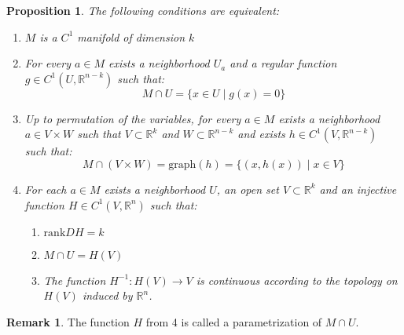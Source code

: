 \documentclass[11pt,a4paper]{article}
\theoremstyle{definition}
\newtheorem{remark}{Remark}[section]
\theoremstyle{plain}
\newtheorem{proposition}[theorem]{Proposition}
\newcommand{\R}{\mathbb{R}}
\begin{document}
	\begin{proposition}
		The following conditions are equivalent:
		\begin{enumerate}
			\item $M$ is a $C^1$ manifold of dimension $k$
			\item For every $a \in M$ exists a neighborhood $U_a$ and a 
			regular function $g \in C^1(U,\R^{n-k})$ such that:
			\[
				M \cap U = \{x \in U \mid g(x) = 0\}
			\]
			\item Up to permutation of the variables, for every $a \in M$
			exists a neighborhood $a \in V \times W$ such that 
			$V \subset \R^k$ and $W \subset \R^{n-k}$ and exists
			$h \in C^1(V, \R^{n-k})$ such that:
			\[
				M \cap (V \times W) = \mathrm{graph}(h) = 
				\{(x,h(x)) \mid x \in V\}
			\]
			\item For each $a \in M$ exists a neighborhood $U$, an open
			set $V \subset \R^k$ and an injective function $H \in C^1(V,\R^n)$
			such that:
			\begin{enumerate}
			\item $\mathrm{rank} DH = k$
			\item $M \cap U = H(V)$
			\item The function $H^{-1} \colon H(V) \to V$ is continuous
			according to the topology on $H(V)$ induced by $\R^n$.
			\end{enumerate}
		\end{enumerate}
	\end{proposition}
	\begin{remark}
		The function $H$ from 4 is called a parametrization of $M \cap U$.
	\end{remark}
	
\end{document}
